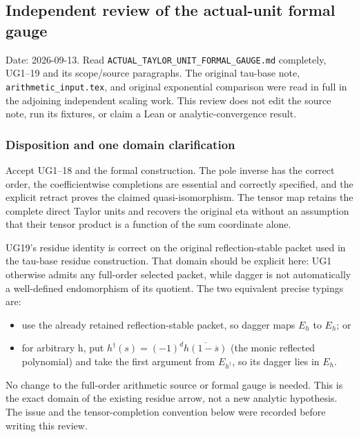 \subsection{Independent review of the actual-unit formal gauge}\label{endpoint-f1_unit_gauge_review--independent-review-of-the-actual-unit-formal-gauge}

Date: 2026-09-13. Read \nolinkurl{ACTUAL_TAYLOR_UNIT_FORMAL_GAUGE.md} completely, UG1--19 and its scope/source paragraphs. The original tau-base note, \nolinkurl{arithmetic_input.tex}, and original exponential comparison were read in full in the adjoining independent scaling work. This review does not edit the source note, run its fixtures, or claim a Lean or analytic-convergence result.

\subsubsection{Disposition and one domain clarification}\label{endpoint-f1_unit_gauge_review--disposition-and-one-domain-clarification}

Accept UG1--18 and the formal construction. The pole inverse has the correct order, the coefficientwise completions are essential and correctly specified, and the explicit retract proves the claimed quasi-isomorphism. The tensor map retains the complete direct Taylor units and recovers the original eta without an assumption that their tensor product is a function of the sum coordinate alone.

UG19's residue identity is correct on the original reflection-stable packet used in the tau-base residue construction. That domain should be explicit here: UG1 otherwise admits any full-order selected packet, while dagger is not automatically a well-defined endomorphism of its quotient. The two equivalent precise typings are:

\begin{itemize}
\tightlist
\item
  use the already retained reflection-stable packet, so dagger maps \(E_h\) to \(E_h\); or
\item
  for arbitrary h, put \(h^\dagger(s)=(-1)^d\overline{h(1-\overline s)}\) (the monic reflected polynomial) and take the first argument from \(E_{h^\dagger}\), so its dagger lies in \(E_h\).
\end{itemize}

No change to the full-order arithmetic source or formal gauge is needed. This is the exact domain of the existing residue arrow, not a new analytic hypothesis. The issue and the tensor-completion convention below were recorded before writing this review.


